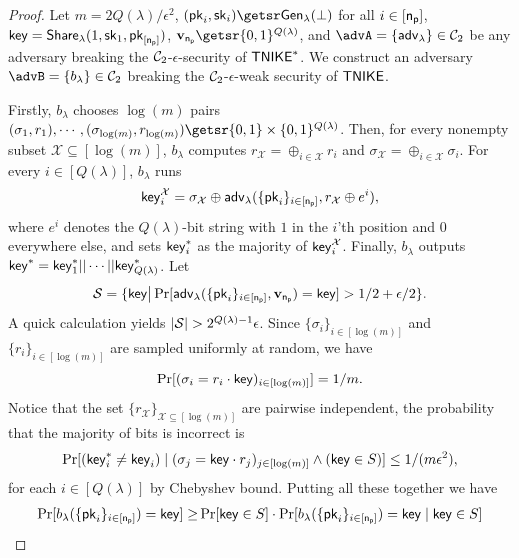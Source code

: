 \begin{proof}
	Let $m =  2Q(\lambda)/\epsilon^2$, $(\pk_i, \sk_i) \getsr \gen(\bot)$ for all $i \in [\mathsf{n_p}]$, $\mathsf{key} = {\mathsf{Share}}_\lambda(1, \mathsf{sk}_1, \mathsf{pk}_{[\mathsf{n_p}]})$, $\vec v_{\pnum} \getsr \bin^{Q(\lambda)}$, and $\advA = \{\adv\} \in \cc_2$ be any adversary breaking the $\mathcal{C}_2$-$\epsilon$-security of $\mathsf{TNIKE}^*$.
	We construct an adversary $\advB = \{b_{\lambda}\} \in \cc_2$ breaking the $\mathcal{C}_2$-$\epsilon$-weak security of $\mathsf{TNIKE}$.
	
	Firstly, $b_{\lambda}$ chooses $\log (m)$ pairs $(\sigma_1, r_1), \cdots, (\sigma_{\log (m)}, r_{\log (m)}) \getsr \{0,1\} \times \{0,1\}^{Q(\lambda)}$. Then, for every nonempty subset $\mathcal{X} \subseteq [\log (m)]$, $b_{\lambda}$ computes $r_\mathcal{X} = \oplus_{i \in \mathcal{X}} r_i$ and $\sigma_\mathcal{X} = \oplus_{i \in \mathcal{X}} \sigma_i$. For every $i \in [Q(\lambda)]$, $b_{\lambda}$ runs 
	$$\mathsf{key}_i^\mathcal{X} = \sigma_\mathcal{X} \oplus {\mathsf{adv}}_\lambda(\{\mathsf{pk}_i\}_{i\in[\mathsf{n_p}]}, r_\mathcal{X} \oplus e^{i}),$$ 
	where $e^{i}$ denotes the $Q(\lambda)$-bit string with $1$ in the $i$'th position and 0 everywhere else, and sets $\mathsf{key}_i^*$ as the majority of ${\mathsf{key}_i^\mathcal{X}}$. Finally, $b_{\lambda}$ outputs $\mathsf{key}^* = \mathsf{key}_1^*|| \cdots ||\mathsf{key}_{Q(\lambda)}^*$.
	Let 
	$$\mathcal{S} = \{\mathsf{key} \big{|} \Pr[{\mathsf{adv}}_\lambda(\{\mathsf{pk}_i\}_{i\in[\mathsf{n_p}]}, \mathbf{v}_{\mathsf{n_p}} \allowbreak ) = \mathsf{key}] > 1/2 + \epsilon/2\}.$$ 
	A quick calculation yields $|\mathcal{S}| > 2^{Q(\lambda) - 1}\epsilon$. 
	Since $\{\sigma_i\}_{i \in [\log (m)]}$ and $\{r_i\}_{i \in [\log(m)]}$ are sampled uniformly at random, 
	we have 
	$$\Pr[(\sigma_{i} = r_{i} \cdot \mathsf{key})_{i \in [\log (m)]}] = 1/m.$$ 
	Notice that the set $\{r_{\mathcal{X}}\}_{\mathcal{X} \subseteq [\log(m)]}$ are pairwise independent, the probability that the majority of bits is incorrect is 
	$$\Pr[(\mathsf{key}_i^* \neq \mathsf{key}_i) \mid (\sigma_j = \mathsf{key} \cdot r_j)_{j \in [\log (m)]} \land (\mathsf{key} \in S)] \leq 1/(m\epsilon^2),$$
	for each $i \in [Q(\lambda)]$ by Chebyshev bound. Putting all these together we have
	\[\begin{split}
		\Pr[b_{\lambda}(\{\pk_i\}_{i\in[\pnum]}) = \tempkey]
		\geq&  \Pr[\tempkey \in S] \cdot \Pr[b_{\lambda}(\{\pk_i\}_{i\in[\pnum]}) = \tempkey \mid \tempkey \in S]\\

\end{split}\]
\end{proof}
